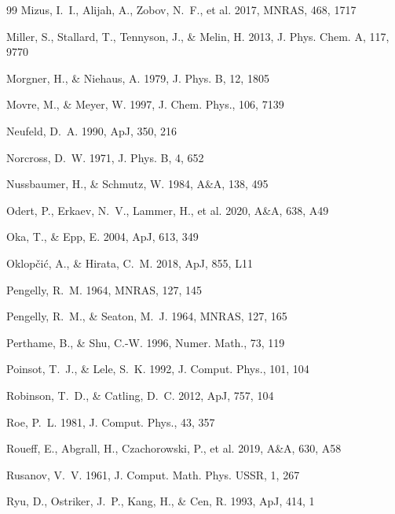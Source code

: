 \begin{thebibliography}{99}
Mizus, I.~I., Alijah, A., Zobov, N.~F., et al. 2017, MNRAS, 468, 1717

Miller, S., Stallard, T., Tennyson, J., \& Melin, H. 2013,
J. Phys. Chem. A, 117, 9770

Morgner, H., \& Niehaus, A. 1979, J. Phys. B, 12, 1805

Movre, M., \& Meyer, W. 1997, J. Chem. Phys., 106, 7139

Neufeld, D.~A. 1990, ApJ, 350, 216

Norcross, D.~W. 1971, J. Phys. B, 4, 652

Nussbaumer, H., \& Schmutz, W. 1984, A\&A, 138, 495

Odert, P., Erkaev, N.~V., Lammer, H., et al. 2020, A\&A, 638, A49

Oka, T., \& Epp, E. 2004, ApJ, 613, 349

Oklop\v{c}i\'c, A., \& Hirata, C.~M. 2018, ApJ, 855, L11

Pengelly, R.~M. 1964, MNRAS, 127, 145

Pengelly, R.~M., \& Seaton, M.~J. 1964, MNRAS, 127, 165

Perthame, B., \& Shu, C.-W. 1996, Numer. Math., 73, 119

Poinsot, T.~J., \& Lele, S.~K. 1992, J. Comput. Phys., 101, 104

Robinson, T.~D., \& Catling, D.~C. 2012, ApJ, 757, 104

Roe, P.~L. 1981, J. Comput. Phys., 43, 357

Roueff, E., Abgrall, H., Czachorowski, P., et al. 2019, A\&A, 630, A58

Rusanov, V.~V. 1961, J. Comput. Math. Phys. USSR, 1, 267

Ryu, D., Ostriker, J.~P., Kang, H., \& Cen, R. 1993, ApJ, 414, 1


\end{thebibliography}
